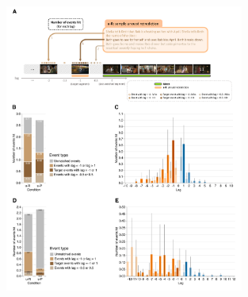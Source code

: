 \documentclass[10pt]{article}
\providecommand{\DIFaddbeginFL}{} %
\providecommand{\DIFdelbeginFL}{} %
\providecommand{\DIFdelendFL}{} %
\newcommand{\DIFscaledelfig}{0.5}
\newlength{\DIFdelgraphicswidth} %
\newlength{\DIFdelgraphicsheight} %
\newcommand{\DIFaddincludegraphics}[2][]{{\color{blue}\fbox{\DIFOincludegraphics[#1]{#2}}}} %
\newcommand{\DIFdelincludegraphics}[2][]{%
\sbox{\DIFdelgraphicsbox}{\DIFOincludegraphics[#1]{#2}}%
\settoboxwidth{\DIFdelgraphicswidth}{\DIFdelgraphicsbox} %
\settoboxtotalheight{\DIFdelgraphicsheight}{\DIFdelgraphicsbox} %
\scalebox{\DIFscaledelfig}{%
\parbox[b]{\DIFdelgraphicswidth}{\usebox{\DIFdelgraphicsbox}\\[-\baselineskip] \rule{\DIFdelgraphicswidth}{0em}}\llap{\resizebox{\DIFdelgraphicswidth}{\DIFdelgraphicsheight}{%
\setlength{\unitlength}{\DIFdelgraphicswidth}%
\begin{picture}(1,1)%
\thicklines\linethickness{2pt} %
{\color[rgb]{1,0,0}\put(0,0){\framebox(1,1){}}}%
{\color[rgb]{1,0,0}\put(0,0){\line( 1,1){1}}}%
{\color[rgb]{1,0,0}\put(0,1){\line(1,-1){1}}}%
\end{picture}%
}\hspace*{3pt}}} %
} %
\DeclareRobustCommand{\DIFaddbeginFL}{\DIFOaddbeginFL \let\includegraphics\DIFaddincludegraphics} %
\DeclareRobustCommand{\DIFdelbeginFL}{\DIFOdelbeginFL \let\includegraphics\DIFdelincludegraphics} %
\DeclareRobustCommand{\DIFdelendFL}{\DIFOaddendFL \let\includegraphics\DIFOincludegraphics} %
\begin{document}
\begin{figure}[tp]
  \centering
  \DIFdelbeginFL %
\DIFdelendFL \DIFaddbeginFL \includegraphics[width=0.7\textwidth]{results2}


\end{figure}
\end{document}
